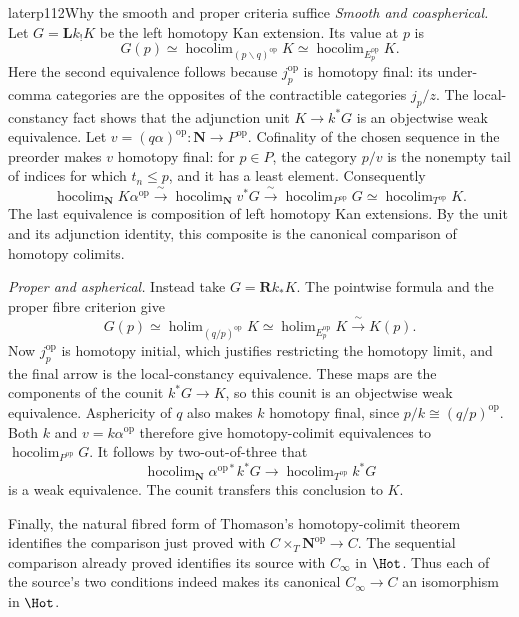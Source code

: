 \begin{dcomment}{later}{p112}{Why the smooth and proper criteria suffice}
\emph{Smooth and coaspherical.} Let $G=\mathbf Lk_!K$ be the left homotopy Kan extension. Its value at $p$ is
\[
 G(p)\simeq
 \operatorname{hocolim}_{(p\backslash q)^{\mathrm{op}}}K
 \simeq\operatorname{hocolim}_{E_p^{\mathrm{op}}}K.
\]
Here the second equivalence follows because $j_p^{\mathrm{op}}$ is homotopy final: its under-comma categories are the opposites of the contractible categories $j_p/z$. The local-constancy fact shows that the adjunction unit $K\to k^*G$ is an objectwise weak equivalence. Let $v=(q\alpha)^{\mathrm{op}}:\mathbf N\to P^{\mathrm{op}}$. Cofinality of the chosen sequence in the preorder makes $v$ homotopy final: for $p\in P$, the category $p/v$ is the nonempty tail of indices for which $t_n\le p$, and it has a least element. Consequently
\[
 \operatorname{hocolim}_{\mathbf N}K\alpha^{\mathrm{op}}
 \xrightarrow{\ \sim\ }
 \operatorname{hocolim}_{\mathbf N}v^*G
 \xrightarrow{\ \sim\ }
 \operatorname{hocolim}_{P^{\mathrm{op}}}G
 \simeq\operatorname{hocolim}_{T^{\mathrm{op}}}K.
\]
The last equivalence is composition of left homotopy Kan extensions. By the unit and its adjunction identity, this composite is the canonical comparison of homotopy colimits.

\emph{Proper and aspherical.} Instead take $G=\mathbf Rk_*K$. The pointwise formula and the proper fibre criterion give
\[
 G(p)\simeq
 \operatorname{holim}_{(q/p)^{\mathrm{op}}}K
 \simeq\operatorname{holim}_{E_p^{\mathrm{op}}}K
 \xrightarrow{\ \sim\ }K(p).
\]
Now $j_p^{\mathrm{op}}$ is homotopy initial, which justifies restricting the homotopy limit, and the final arrow is the local-constancy equivalence. These maps are the components of the counit $k^*G\to K$, so this counit is an objectwise weak equivalence. Asphericity of $q$ also makes $k$ homotopy final, since $p/k\cong(q/p)^{\mathrm{op}}$. Both $k$ and $v=k\alpha^{\mathrm{op}}$ therefore give homotopy-colimit equivalences to $\operatorname{hocolim}_{P^{\mathrm{op}}}G$. It follows by two-out-of-three that
\[
 \operatorname{hocolim}_{\mathbf N}\alpha^{\mathrm{op}*}k^*G
 \longrightarrow\operatorname{hocolim}_{T^{\mathrm{op}}}k^*G
\]
is a weak equivalence. The counit transfers this conclusion to $K$.

Finally, the natural fibred form of Thomason's homotopy-colimit theorem identifies the comparison just proved with $C\times_T\mathbf N^{\mathrm{op}}\to C$. The sequential comparison already proved identifies its source with $C_\infty$ in $\Hot$. Thus each of the source's two conditions indeed makes its canonical $C_\infty\to C$ an isomorphism in $\Hot$.


\end{dcomment}
